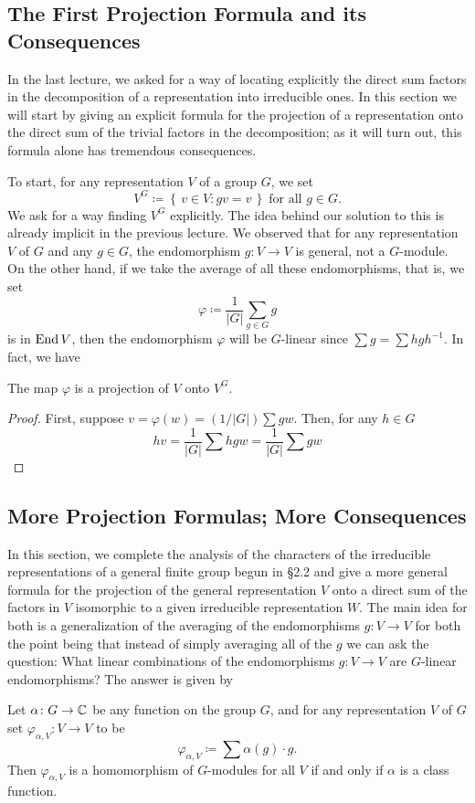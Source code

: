 \subsection{The First Projection Formula and its Consequences}
In the last lecture, we asked for a way of locating explicitly the direct
sum factors in the decomposition of a representation into irreducible
ones. In this section we will start by giving an explicit formula for the
projection of a representation onto the direct sum of the trivial factors
in the decomposition; as it will turn out, this formula alone has tremendous
consequences.

To start, for any representation $V$ of a group $G$, we set
\[
V^G\coloneq\left\{\,v\in V:gv=v\,\right\}
\;\text{for all $g\in G$.}
\]
We ask for a way finding $V^G$ explicitly. The idea behind our solution to
this is already implicit in the previous lecture. We observed that for any
representation $V$ of $G$ and any $g\in G$, the endomorphism $g\colon V\to
V$ is general, not a $G$-module. On the other hand, if we take the average
of all these endomorphisms, that is, we set
\[
\varphi\coloneq\frac{1}{|G|}\sum_{g\in G}g
\]
is in $\operatorname{End} V$, then the endomorphism $\varphi$ will be $G$-linear since
$\sum g=\sum hgh^{-1}$. In fact, we have
\begin{proposition}
The map $\varphi$ is a projection of $V$ onto $V^G$.
\end{proposition}

\begin{proof}
First, suppose $v=\varphi(w)=(1/|G|)\sum gw$. Then, for any $h\in
G$
\[
hv=\frac{1}{|G|}\sum hgw=\frac{1}{|G|}\sum gw
\]
\end{proof}

\subsection{More Projection Formulas; More Consequences}
In this section, we complete the analysis of the characters of the
irreducible representations of a general finite group begun in \S2.2 and
give a more general formula for the projection of the general
representation $V$ onto a direct sum of the factors in $V$ isomorphic to a
given irreducible representation $W$. The main idea for both is a
generalization of the averaging of the endomorphisms $g\colon V\to V$ for
both the point being that instead of simply averaging all of the $g$ we can
ask the question: What linear combinations of the endomorphisms $g\colon
V\to V$ are $G$-linear endomorphisms? The answer is given by
\begin{proposition}
Let $\alpha\colon G\to\mathbb{C}$ be any function on the group $G$, and for any
representation $V$ of $G$ set $\varphi_{\alpha,V}\colon V\to V$ to be
\[
\varphi_{\alpha,V}\coloneq\sum \alpha(g)\cdot g.
\]
Then $\varphi_{\alpha,V}$ is a homomorphism of $G$-modules for all $V$ if
and only if $\alpha$ is a class function.
\end{proposition}

